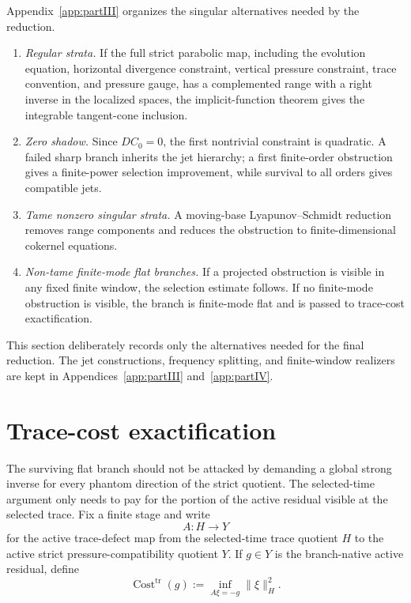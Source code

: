 \documentclass[11pt]{article}
\numberwithin{equation}{section}
\theoremstyle{plain}
\theoremstyle{definition}
\theoremstyle{remark}
\DeclareMathOperator{\Cost}{Cost}
\newcommand{\tr}{\operatorname{tr}}
\begin{document}
Appendix~\ref{app:partIII} organizes the singular alternatives needed by the reduction.
\begin{enumerate}[label=(\roman*)]
\item \emph{Regular strata.}  If the full strict parabolic map, including the evolution equation, horizontal divergence constraint, vertical pressure constraint, trace convention, and pressure gauge, has a complemented range with a right inverse in the localized spaces, the implicit-function theorem gives the integrable tangent-cone inclusion.
\item \emph{Zero shadow.}  Since \(DC_0=0\), the first nontrivial constraint is quadratic.  A failed sharp branch inherits the jet hierarchy; a first finite-order obstruction gives a finite-power selection improvement, while survival to all orders gives compatible jets.
\item \emph{Tame nonzero singular strata.}  A moving-base Lyapunov--Schmidt reduction removes range components and reduces the obstruction to finite-dimensional cokernel equations.
\item \emph{Non-tame finite-mode flat branches.}  If a projected obstruction is visible in any fixed finite window, the selection estimate follows.  If no finite-mode obstruction is visible, the branch is finite-mode flat and is passed to trace-cost exactification.
\end{enumerate}
This section deliberately records only the alternatives needed for the final reduction.  The jet constructions, frequency splitting, and finite-window realizers are kept in Appendices~\ref{app:partIII} and~\ref{app:partIV}.

\section{Trace-cost exactification}\label{sec:main-trace-cost}

The surviving flat branch should not be attacked by demanding a global strong inverse for every phantom direction of the strict quotient.  The selected-time argument only needs to pay for the portion of the active residual visible at the selected trace.  Fix a finite stage and write
\[
        A:H\to Y
\]
for the active trace-defect map from the selected-time trace quotient \(H\) to the active strict pressure-compatibility quotient \(Y\).  If \(g\in Y\) is the branch-native active residual, define
\begin{equation}\label{eq:main-trace-cost}
        \Cost^{\tr}(g):=\inf_{A\xi=-g}\|\xi\|_H^2.
\end{equation}
\end{document}
